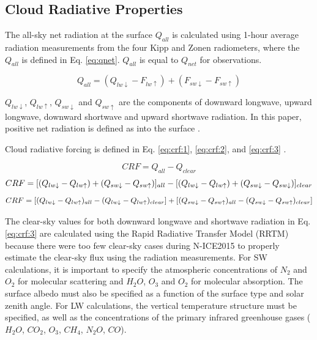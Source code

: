 \subsection{Cloud Radiative Properties}
The all-sky net radiation at the surface $Q_{all}$ is calculated using 1-hour average radiation measurements from the four Kipp and Zonen radiometers, where the $Q_{all}$ is defined in Eq. \ref{eq:qnet}. $Q_{all}$ is equal to $Q_{net}$ for observations.

\begin{equation}\label{eq:qnet}
Q_{all} = (Q_{lw \downarrow} - F_{lw \uparrow}) + (F_{sw \downarrow} - F_{sw \uparrow})
\end{equation}

$Q_{lw \downarrow}$, $Q_{lw \uparrow}$, $Q_{sw \downarrow}$ and $Q_{sw \uparrow}$ are the components of downward longwave, upward longwave, downward shortwave and upward shortwave radiation. In this paper, positive net radiation is defined as into the surface \citep{miller:2015}.

Cloud radiative forcing is defined in Eq. \ref{eq:crf:1}, \ref{eq:crf:2}, and \ref{eq:crf:3} \citep{ramanathan:1989, miller:2015}.

\begin{equation}\label{eq:crf:1}
CRF = Q_{all} - Q_{clear}
\end{equation}
\begin{dmath}\label{eq:crf:2}
CRF = [(Q_{lw \downarrow} - Q_{lw \uparrow}) + (Q_{sw \downarrow} - Q_{sw \uparrow})]_{all} \\
\\ - [(Q_{lw \downarrow} - Q_{lw \uparrow}) + (Q_{sw \downarrow} - Q_{sw \downarrow})]_{clear}
\end{dmath}
\begin{dmath}\label{eq:crf:3}
CRF = [(Q_{lw \downarrow} - Q_{lw \uparrow})_{all} - (Q_{lw \downarrow} - Q_{lw \uparrow})_{clear}] \\
\\ + [(Q_{sw \downarrow} - Q_{sw \uparrow})_{all} -  (Q_{sw \downarrow} - Q_{sw \uparrow})_{clear}]
\end{dmath}

The clear-sky values for both downward longwave and shortwave radiation in Eq. \ref{eq:crf:3} are calculated using the Rapid Radiative Transfer Model (RRTM) \citep{mlawer:1997} because there were too few clear-sky cases during N-ICE2015 to properly estimate the clear-sky flux using the radiation measurements. For SW calculations, it is important to specify the atmospheric concentrations of $N_{2}$ and $O_{2}$ for molecular scattering and $H_{2}O$, $O_{3}$ and $O_{2}$ for molecular absorption. The surface albedo must also be specified as a function of the surface type and solar zenith angle. For LW calculations, the vertical temperature structure must be specified, as well as the concentrations of the primary infrared greenhouse gases ($H_{2}O$, $CO_{2}$, $O_{3}$, $CH_{4}$, $N_{2}O$, $CO$).

